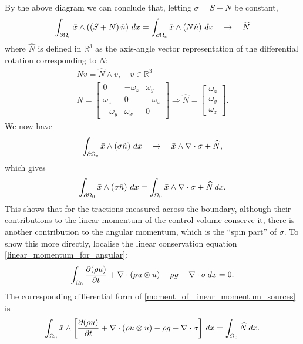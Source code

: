 By the above diagram we can conclude that, letting $\sigma = S + N$ be constant,
\begin{align*}
    \int_{{\partial\Omega}_c} \bar{x} \wedge \left(\left(S + N\right)\hat{n}\right)\,dx
    =
    \int_{{\partial\Omega}_c} \bar{x} \wedge \left(N\hat{n}\right)\,dx
    \quad\rightarrow\quad
    \widehat{N}
\end{align*}
where $\widehat{N}$ is defined in $\mathbb{R}^3$ as the axis-angle vector representation of the differential rotation corresponding to $N$:
\begin{equation}
\begin{split}
    Nv = \widehat{N}\wedge v,\quad v\in\mathbb{R}^3
    \\
    N = \begin{bmatrix}
        0 & -\omega_z & \omega_y \\ \omega_z & 0 & -\omega_x  \\ -\omega_y & \omega_x & 0
    \end{bmatrix} \Rightarrow \widehat{N} = \begin{bmatrix} \omega_x \\ \omega_y \\ \omega_z \end{bmatrix}.
\end{split}
\end{equation}
We now have
\begin{equation}
    \int_{{\partial\Omega}_c} \bar{x}\wedge\left(\sigma\hat{n}\right)\,dx \quad\rightarrow\quad
    \bar{x}\wedge \nabla\cdot \sigma + \widehat{N},
\end{equation}
which gives 
\begin{equation}
    \int_{{\partial\Omega_0}} \bar{x} \wedge \left(\sigma\hat{n}\right)\,dx = \int_{\Omega_0} \bar{x}\wedge\nabla\cdot\sigma + \widehat{N}\,dx.
\end{equation}
This shows that for the tractions measured across the boundary, although their contributions to the linear momentum of the control volume conserve it,
there is another contribution to the angular momentum, which is the ``spin part'' of $\sigma$.
To show this more directly, localise the linear conservation equation \eqref{linear_momentum_for_angular}:
\begin{equation}\label{linear_momentum_for_angular_localised}
    \int_{{\Omega_0}} \frac{\partial (\rho u)}{\partial t} + \nabla\cdot\left(\rho u\otimes u\right) - \rho g - \nabla\cdot\sigma\,dx = 0.
\end{equation}
The corresponding differential form of \eqref{moment_of_linear_momentum_sources} is
\begin{equation}\label{moment_of_linear_momentum_sources_localised}
    \int_{{\Omega_0}} \bar{x} \wedge \left[\frac{\partial (\rho u)}{\partial t} + \nabla\cdot\left(\rho u\otimes u\right) - \rho g - \nabla\cdot\sigma\right]\,dx
    = \int_{\Omega_0} \widehat{N}\,dx.
\end{equation}
